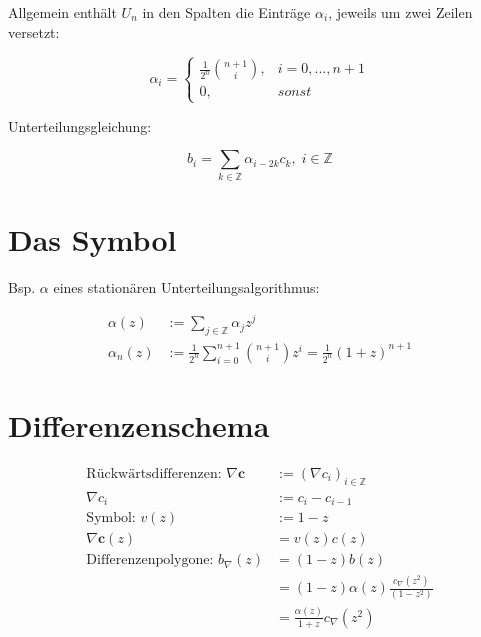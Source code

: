 \documentclass[8pt, DIV15, twocolumn]{scrartcl}
\begin{document}
Allgemein enthält $U_n$ in den Spalten die Einträge $\alpha_i$, jeweils um zwei Zeilen versetzt:

\begin{equation*}
\alpha_i = \begin{cases}
        \frac{1}{2^n} \binom{n+1}{i}, & i = 0, ..., n+1\\
        0, & sonst
        \end{cases}
\end{equation*}

Unterteilungsgleichung:

\begin{equation*}
b_i = \sum\limits_{k\in \mathbb{Z}} \alpha_{i-2k} c_k, \; i\in \mathbb{Z}
\end{equation*}


\section*{Das Symbol}
Bsp. $\alpha$ eines stationären Unterteilungsalgorithmus:

\begin{equation*}
\begin{aligned}
\alpha \left( z \right) &:= \sum\limits_{j\in\mathbb{Z}} \alpha_j z^j \\
\alpha_n \left( z \right) &:= \frac{1}{2^n} \sum\limits_{i=0}^{n+1} \binom{n+1}{i} z^i = \frac{1}{2^n} \left( 1 + z \right)^{n+1}
\end{aligned}
\end{equation*}

\section*{Differenzenschema}

\begin{equation*}
\begin{aligned}
\text{Rückwärtsdifferenzen: }\nabla \mathbf{c} &:= \left( \nabla c_i \right)_{i \in \mathbb{Z}} \\
\nabla c_i &:= c_i - c_{i-1} \\
\text{Symbol: } v \left( z \right) &:= 1 - z \\
\nabla \mathbf{c} \left(z\right) &= v \left(z\right) c \left(z\right) \\
\text{Differenzenpolygone: } b_\nabla \left( z\right) &= \left(1-z\right)b\left(z\right) \\
&= \left(1-z\right) \alpha \left(z\right) \frac{c_\nabla \left(z^2\right)}{\left(1-z^2\right)} \\
&= \frac{\alpha\left(z\right)}{1+z} c_\nabla \left(z^2\right)
\end{aligned}
\end{equation*}
\end{document}
